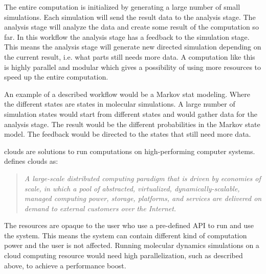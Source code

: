 The entire computation is initialized by generating a large number of
small simulations. Each simulation will send the result data to the
analysis stage. The analysis stage will analyze the data and create
some result of the computation so far. In this workflow the analysis
stage has a feedback to the simulation stage. This means the analysis
stage will generate new directed simulation depending on the current
result, i.e. what parts still needs more data. A computation like this
is highly parallel and modular which gives a possibility of using more
resources to speed up the entire computation.

An example of a described workflow would be a Markov stat
modeling. Where the different states are states in molecular
simulations. A large number of simulation states would start from
different states and would gather data for the analysis stage. The
result would be the different probabilities in the Markov state
model. The feedback would be directed to the states that still need
more data.%



clouds are solutions to run computations on high-performing computer
systems. \citet{foster:2008} defines clouds as:

\begin{quote} \slshape
  A large-scale distributed computing paradigm that is driven by
  economies of scale, in which a pool of abstracted, virtualized,
  dynamically-scalable, managed computing power, storage, platforms,
  and services are delivered on demand to external customers over
  the Internet.
\end{quote}

The resources are opaque to the user who use a pre-defined API to run
and use the system. This means the system can contain different kind
of computation power and the user is not affected. Running molecular
dynamics simulations on a cloud computing resource would need high
parallelization, such as described above, to achieve a performance
boost.


